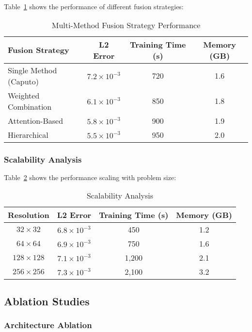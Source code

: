 \documentclass[12pt,a4paper]{article}
\theoremstyle{definition}
\begin{document}
Table~\ref{tab:fusion_analysis} shows the performance of different fusion strategies:

\begin{table}[H]
\centering
\caption{Multi-Method Fusion Strategy Performance}
\label{tab:fusion_analysis}
\begin{tabular}{@{}lccc@{}}
\toprule
Fusion Strategy & L2 Error & Training Time (s) & Memory (GB) \\
\midrule
Single Method (Caputo) & $7.2 \times 10^{-3}$ & 720 & 1.6 \\
Weighted Combination & $6.1 \times 10^{-3}$ & 850 & 1.8 \\
Attention-Based & $5.8 \times 10^{-3}$ & 900 & 1.9 \\
Hierarchical & $5.5 \times 10^{-3}$ & 950 & 2.0 \\
\bottomrule
\end{tabular}
\end{table}

\subsubsection{Scalability Analysis}

Table~\ref{tab:scalability} shows the performance scaling with problem size:

\begin{table}[H]
\centering
\caption{Scalability Analysis}
\label{tab:scalability}
\begin{tabular}{@{}cccc@{}}
\toprule
Resolution & L2 Error & Training Time (s) & Memory (GB) \\
\midrule
$32 \times 32$ & $6.8 \times 10^{-3}$ & 450 & 1.2 \\
$64 \times 64$ & $6.9 \times 10^{-3}$ & 750 & 1.6 \\
$128 \times 128$ & $7.1 \times 10^{-3}$ & 1,200 & 2.1 \\
$256 \times 256$ & $7.3 \times 10^{-3}$ & 2,100 & 3.2 \\
\bottomrule
\end{tabular}
\end{table}

\subsection{Ablation Studies}

\subsubsection{Architecture Ablation}
\end{document}
